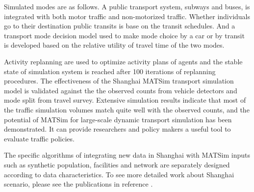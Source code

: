 Simulated modes are as follows. A public transport system, subways and buses, is integrated with both motor traffic and non-motorized traffic. Whether individuals go to their destination public transits is base on the transit schedules. And a transport mode decision model used to make mode choice by a car or by transit is developed based on the relative utility of travel time of the two modes.

Activity replanning are used to optimize activity plans of agents and the stable state of simulation system is reached after 100 iterations of replanning procedures. The effectiveness of the Shanghai MATSim transport simulation model is validated against the the observed counts from vehicle detectors and mode split from travel survey. Extensive simulation results indicate that most of the traffic simulation volumes match quite well with the observed counts, and the potential of MATSim for large-scale dynamic transport simulation has been demonstrated. It can provide researchers and policy makers a useful tool to evaluate traffic policies. 

The specific algorithms of integrating new data in Shanghai with MATSim inputs such as synthetic population, facilities and network are separately designed according to data characteristics. To see more detailed work about Shanghai scenario, please see the publications in reference \citet[][]{ZhangLEtAl_TRR_2014}.


